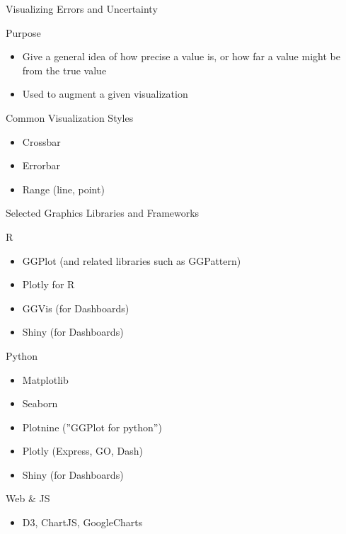 \documentclass[ignorenonframetext,xcolor=x11names]{beamer}
\begin{document}
\begin{frame}{Visualizing Errors and Uncertainty}
\begin{block}{Purpose}
	\begin{itemize}
		\item Give a general idea of how precise a value is, or how far a value might be from the true value
		\item Used to augment a given visualization
	\end{itemize}
\end{block}
\begin{block}{Common Visualization Styles}
\begin{itemize}
  \item Crossbar
  \item Errorbar
  \item Range (line, point)
\end{itemize}  
\end{block}
\end{frame}

\begin{frame}{Selected Graphics Libraries and Frameworks}
\begin{block}{R}
\begin{itemize}
  \item GGPlot (and related libraries such as GGPattern)
  \item Plotly for R
  \item GGVis (for Dashboards)
  \item Shiny (for Dashboards)
\end{itemize}
\end{block}
\begin{block}{Python}
\begin{itemize}
  \item Matplotlib
  \item Seaborn
  \item Plotnine (''GGPlot for python'')
  \item Plotly (Express, GO, Dash)
  \item Shiny (for Dashboards)
\end{itemize}
\end{block}
\begin{block}{Web \& JS}
\begin{itemize}
  \item D3, ChartJS, GoogleCharts
\end{itemize}
\end{block}
\end{frame}
\end{document}
